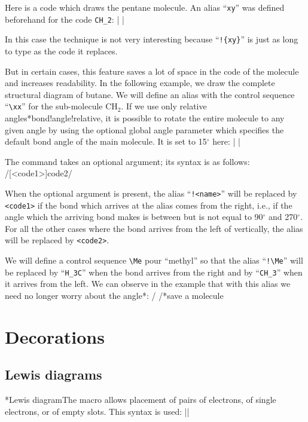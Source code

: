 \documentclass[10pt]{article}
\makeatletter
\newcommand\idx{\@ifstar{\let\print@or@not\@gobble\idx@}{\let\print@or@not\@firstofone\idx@}}
\newcommand\idx@[1]{%
	\ifcat\expandafter\noexpand\@car#1\@nil\relax%
		\expandafter\ifx\@car#1\@nil\protect
			\index{#1}%
			\print@or@not{#1}%
		\else
			\saveexpandmode\expandarg
			\StrSubstitute{\string#1}{\string @}{\@empty\protect\symbol{'100}}[\temp@]%
			\StrGobbleLeft\temp@1[\temp@]%
			\restoreexpandmode
			\expandafter\index\expandafter{\temp@ @\protect\texttt{\protect\textbackslash\temp@}}%
			\print@or@not{\texttt{\string#1}}%
		\fi
	\else
		\index{#1}%
		\print@or@not{#1}%
	\fi
}
\newcommand\make@car@active[2]{%
	\catcode`#1\active
	\begingroup
		\lccode`\~`#1\relax
		\lowercase{\endgroup\def~{#2}}%
}
\newif\if@exstar
\newcommand\exemple{%
	\begingroup
	\parskip\z@
	\@makeother\;\@makeother\!\@makeother\?\@makeother\:%
	\@ifstar{\@exstartrue\exemple@}{\@exstarfalse\exemple@}}
\newcommand\exemple@[2][65]{%
	\medbreak\noindent
	\begingroup
		\let\do\@makeother\dospecials
		\make@car@active\ { {}}%
		\make@car@active\^^M{\par\leavevmode}%
		\make@car@active\,{\leavevmode\kern\z@\string,}%
		\make@car@active\-{\leavevmode\kern\z@\string-}%
		\make@car@active\>{\leavevmode\kern\z@\string>}%
		\make@car@active\<{\leavevmode\kern\z@\string<}%
		\exemple@@{#1}{#2}%
}
\newcommand\exemple@@[3]{%
	\def\@tempa##1#3{\exemple@@@{#1}{#2}{##1}}%
	\@tempa
}
\newcommand\exemple@@@[3]{%
	\xdef\the@code{#3}%
	\endgroup
	\if@exstar
		\begingroup
			\fboxrule0.4pt
			\let\breakboxparindent\z@
			\def\bkvz@bottom{\hrule\@height\fboxrule}%
			\let\bkvz@before@breakbox\relax
			\def\bkvz@set@linewidth{\advance\linewidth\dimexpr-2\fboxrule-2\fboxsep}%
			\def\bkvz@left{\vrule\@width\fboxrule\hskip\fboxsep}%
			\def\bkvz@right{\hskip\fboxsep\vrule\@width\fboxrule}%
			\def\bkvz@top{\hbox to \hsize{%
				\vrule\@width\fboxrule\@height\fboxrule
				\leaders\bkvz@bottom\hfill
				\ECFAugie
				\fboxsep\z@
				\colorbox{black}{\kern0.25em\color{white}\footnotesize\lower0.5ex\hbox{\strut#2}\kern0.25em}%
				\leaders\bkvz@bottom\hfill
				\vrule\@width\fboxrule\@height\fboxrule}}%
			\breakbox
				\kern.5ex\relax
				\ttfamily\footnotesize\the@code\par
				\normalfont
				\kern3pt
				\hrule height0.1pt width\linewidth depth0.1pt
				\vskip5pt
				\rightskip0pt plus 1fill
				\everypar{{\color{lightgray}\rlap{\vrule height0.1pt width\linewidth depth0.1pt}}\hskip0pt plus 1fill}%
				\newlinechar`\^^M\everyeof{\noexpand}\scantokens{#3}\par
			\endbreakbox
		\endgroup
	\else
		\vskip0.5ex
		\boxput*(0,1)
			{\fboxsep\z@
			\hbox{\ECFAugie\colorbox{black}{\leavevmode\kern0.25em{\color{white}\footnotesize\strut#2}\kern0.25em}}%
			}%
			{\fboxsep5pt
			\fbox{%
				$\vcenter{\hsize\dimexpr0.#1\linewidth-\fboxsep-\fboxrule\relax
					\kern5pt\parskip0pt \ttfamily\footnotesize\the@code}%
				\vcenter{\kern5pt\hsize\dimexpr\linewidth-0.#1\linewidth-\fboxsep-\fboxrule\relax
					\everypar{{\color{lightgray}\rlap{\vrule height0.1pt width\dimexpr\linewidth-0.#1\linewidth-\fboxsep-\fboxrule depth0.1pt}}}%
					\footnotesize\newlinechar`\^^M\everyeof{\noexpand}\scantokens{#3}}$%
				}%
			}%
	\fi
	\medbreak
	\endgroup
}
\let\do\@makeother\dospecials
\def\degres{\ensuremath{{}^\circ}}
\makeatother
\begin{document}
Here is a code which draws the pentane molecule. An alias ``\verb/xy/'' was defined beforehand for the code \verb/CH_2/:
\exemple{Pentane}|
	|

In this case the technique is not very interesting because ``\verb/!{xy}/'' is just as long to type as the code it replaces.

But in certain cases, this feature saves a lot of space in the code of the molecule and increases readability. In the following example, we draw the complete structural diagram of butane. We will define an alias with the control sequence ``\verb/\xx/'' for the sub-molecule $\mathrm{CH_2}$. If we use only relative angles\idx*{bond!angle!relative}, it is possible to rotate the entire molecule to any given angle by using the optional global angle parameter which specifies the default bond angle of the main molecule. It is set to 15\degres{} here:
\exemple{Butane}|
|

The \idx{\definesubmol} command takes an optional argument; its syntax is as follows:
\centerverb/[<code1>]{code2}/
\medskip

When the optional argument is present, the alias ``\verb-!<name>-'' will be replaced by \verb'<code1>' if the bond which arrives at the alias comes from the right, i.e., if the angle which the arriving bond makes is between but is not equal to 90\degres{} and 270\degres{}. For all the other cases where the bond arrives from the left of vertically, the alias will be replaced by \verb-<code2>-.

We will define a control sequence \verb-\Me- pour ``methyl'' so that the alias ``\verb-!\Me-'' will be replaced by ``\verb-H_3C-'' when the bond arrives from the right and by ``\verb-CH_3-'' when it arrives from the left. We can observe in the example that with this alias we need no longer worry about the angle\idx*{}:
\exemple{Dual alias}/
/\idx*{save a molecule}

\section{Decorations}
\subsection{Lewis diagrams}\label{lewis}
\idx*{Lewis diagram}The macro \idx{\lewis} allows placement of pairs of electrons, of single electrons, or of empty slots. This syntax is used:
\centerverb||
\smallskip
\end{document}
